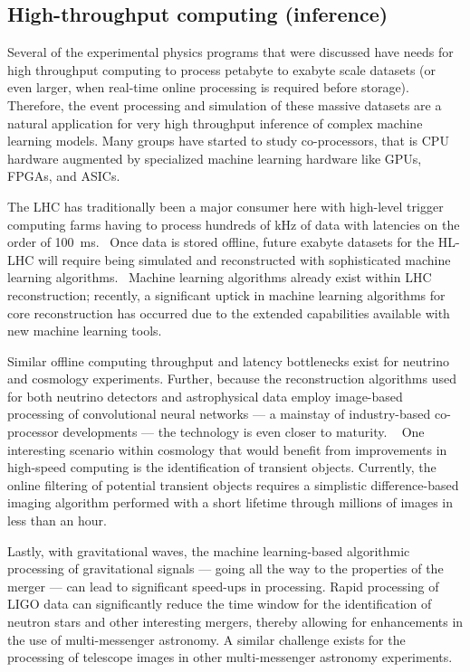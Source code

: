 \documentclass[11pt,letterpaper,fleqn]{article}
\begin{document}
\subsection{High-throughput computing (inference)}

Several of the experimental physics programs that were discussed have needs for high throughput computing to process petabyte to exabyte scale datasets (or even larger, when real-time online processing is required before storage).
Therefore, the event processing and simulation of these massive datasets are a natural application for very high throughput inference of complex machine learning models.
Many groups have started to study co-processors, that is CPU hardware augmented by specialized machine learning hardware like GPUs, FPGAs, and ASICs.  

The LHC has traditionally been a major consumer here with high-level trigger computing farms having to process hundreds of kHz of data with latencies on the order of 100~ms.  Once data is stored offline, future exabyte datasets for the HL-LHC will require being simulated and reconstructed with sophisticated machine learning algorithms.  Machine learning algorithms already exist within LHC reconstruction; recently, a significant uptick in machine learning algorithms for core reconstruction has occurred due to the extended capabilities available with new machine learning tools.

Similar offline computing throughput and latency bottlenecks exist for neutrino and cosmology experiments. Further, because the reconstruction algorithms used for both neutrino detectors and astrophysical data employ image-based processing of convolutional neural networks --- a mainstay of industry-based co-processor developments --- the technology is even closer to maturity.   One interesting scenario within cosmology that would benefit from improvements in high-speed computing is the identification of transient objects. Currently, the online filtering of potential transient objects requires a simplistic difference-based imaging algorithm performed with a short lifetime through millions of images in less than an hour.

Lastly, with gravitational waves, the machine learning-based algorithmic processing of gravitational signals --- going all the way to the properties of the merger --- can lead to significant speed-ups in processing. Rapid processing of LIGO data can significantly reduce the time window for the identification of neutron stars and other interesting mergers, thereby allowing for enhancements in the use of multi-messenger astronomy. A similar challenge exists for the processing of telescope images in other multi-messenger astronomy experiments.
\end{document}
